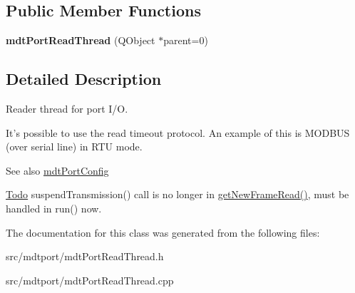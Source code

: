 \subsection*{Public Member Functions}
\begin{DoxyCompactItemize}
\item 
\hypertarget{classmdt_port_read_thread_a180074c2ff60f5103d7e3aa27c1cdb01}{
{\bfseries mdtPortReadThread} (QObject $\ast$parent=0)}
\label{classmdt_port_read_thread_a180074c2ff60f5103d7e3aa27c1cdb01}

\end{DoxyCompactItemize}


\subsection{Detailed Description}
Reader thread for port I/O. 

It's possible to use the read timeout protocol. An example of this is MODBUS (over serial line) in RTU mode.

\begin{DoxySeeAlso}{See also}
\hyperlink{classmdt_port_config}{mdtPortConfig}
\end{DoxySeeAlso}
\begin{Desc}
\item[\hyperlink{todo__todo000007}{Todo}]suspendTransmission() call is no longer in \hyperlink{classmdt_port_thread_a611211e56620ec9c699019452716e4fc}{getNewFrameRead()}, must be handled in run() now. \end{Desc}


The documentation for this class was generated from the following files:\begin{DoxyCompactItemize}
\item 
src/mdtport/mdtPortReadThread.h\item 
src/mdtport/mdtPortReadThread.cpp\end{DoxyCompactItemize}
